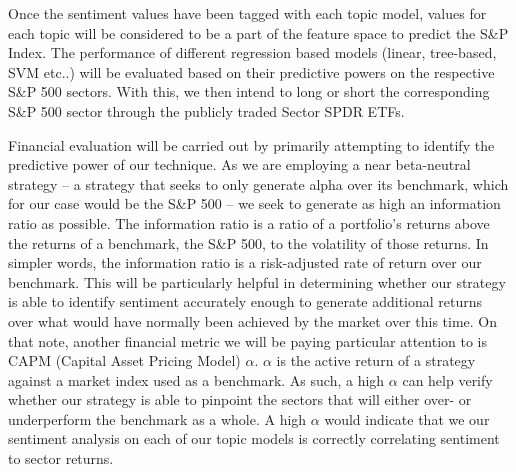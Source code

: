 \documentclass{sig-alternate-05-2015}
\begin{document}
Once the sentiment values have been tagged with each topic model, values for each topic will be considered to be a part of the feature space to predict the S\&P Index. The performance of different regression based models (linear, tree-based, SVM etc..)  will be evaluated based on their predictive powers on the respective S\&P 500 sectors. With this, we then intend to long or short the corresponding S\&P 500 sector through the publicly traded Sector SPDR ETFs.

Financial evaluation will be carried out by primarily attempting to identify the predictive power of our technique. As we are employing a near beta-neutral strategy -- a strategy that seeks to only generate alpha over its benchmark, which for our case would be the S\&P 500 -- we seek to generate as high an information ratio as possible. The information ratio is a ratio of a portfolio's returns above the returns of a benchmark, the S\&P 500, to the volatility of those returns. In simpler words, the information ratio is a risk-adjusted rate of return over our benchmark. This will be particularly helpful in determining whether our strategy is able to identify sentiment accurately enough to generate additional returns over what would have normally been achieved by the market over this time. On that note, another financial metric we will be paying particular attention to is CAPM (Capital Asset Pricing Model) $\alpha$. $\alpha$ is the active return of a strategy against a market index used as a benchmark. As such, a high $\alpha$ can help verify whether our strategy is able to pinpoint the sectors that will either over- or underperform the benchmark as a whole. A high $\alpha$ would indicate that we our sentiment analysis on each of our topic models is correctly correlating sentiment to sector returns. 
\vfill


%
%

%
%

%
%




%

%
%
\balancecolumns
\balancecolumns %
\end{document}
